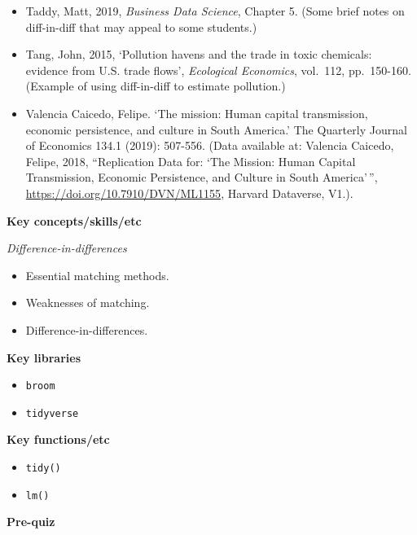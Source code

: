\documentclass[
]{book}
\providecommand{\tightlist}{%
  \setlength{\itemsep}{0pt}\setlength{\parskip}{0pt}}
\begin{document}
\begin{itemize}
\item
  Taddy, Matt, 2019, \emph{Business Data Science}, Chapter 5. (Some brief notes on diff-in-diff that may appeal to some students.)
\item
  Tang, John, 2015, `Pollution havens and the trade in toxic chemicals: evidence from U.S. trade flows', \emph{Ecological Economics}, vol.~112, pp.~150-160. (Example of using diff-in-diff to estimate pollution.)
\item
  Valencia Caicedo, Felipe. `The mission: Human capital transmission, economic persistence, and culture in South America.' The Quarterly Journal of Economics 134.1 (2019): 507-556. (Data available at: Valencia Caicedo, Felipe, 2018, ``Replication Data for: `The Mission: Human Capital Transmission, Economic Persistence, and Culture in South America'\,'', \url{https://doi.org/10.7910/DVN/ML1155}, Harvard Dataverse, V1.).
\end{itemize}

\textbf{Key concepts/skills/etc}

\emph{Difference-in-differences}

\begin{itemize}
\tightlist
\item
  Essential matching methods.
\item
  Weaknesses of matching.
\item
  Difference-in-differences.
\end{itemize}

\textbf{Key libraries}

\begin{itemize}
\tightlist
\item
  \texttt{broom}
\item
  \texttt{tidyverse}
\end{itemize}

\textbf{Key functions/etc}

\begin{itemize}
\tightlist
\item
  \texttt{tidy()}
\item
  \texttt{lm()}
\end{itemize}

\textbf{Pre-quiz}
\end{document}
